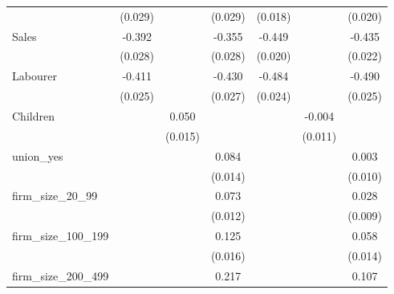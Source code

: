 {\begin{tabular}{l*{6}{c}}
                    &     (0.029)         &                     &     (0.029)         &     (0.018)         &                     &     (0.020)         \\
Sales               &      -0.392\sym{***}&                     &      -0.355\sym{***}&      -0.449\sym{***}&                     &      -0.435\sym{***}\\
                    &     (0.028)         &                     &     (0.028)         &     (0.020)         &                     &     (0.022)         \\
Labourer            &      -0.411\sym{***}&                     &      -0.430\sym{***}&      -0.484\sym{***}&                     &      -0.490\sym{***}\\
                    &     (0.025)         &                     &     (0.027)         &     (0.024)         &                     &     (0.025)         \\
Children            &                     &       0.050\sym{***}&                     &                     &      -0.004         &                     \\
                    &                     &     (0.015)         &                     &                     &     (0.011)         &                     \\
union\_yes           &                     &                     &       0.084\sym{***}&                     &                     &       0.003         \\
                    &                     &                     &     (0.014)         &                     &                     &     (0.010)         \\
firm\_size\_20\_99     &                     &                     &       0.073\sym{***}&                     &                     &       0.028\sym{***}\\
                    &                     &                     &     (0.012)         &                     &                     &     (0.009)         \\
firm\_size\_100\_199   &                     &                     &       0.125\sym{***}&                     &                     &       0.058\sym{***}\\
                    &                     &                     &     (0.016)         &                     &                     &     (0.014)         \\
firm\_size\_200\_499   &                     &                     &       0.217\sym{***}&                     &                     &       0.107\sym{***}\\

\end{tabular}}

